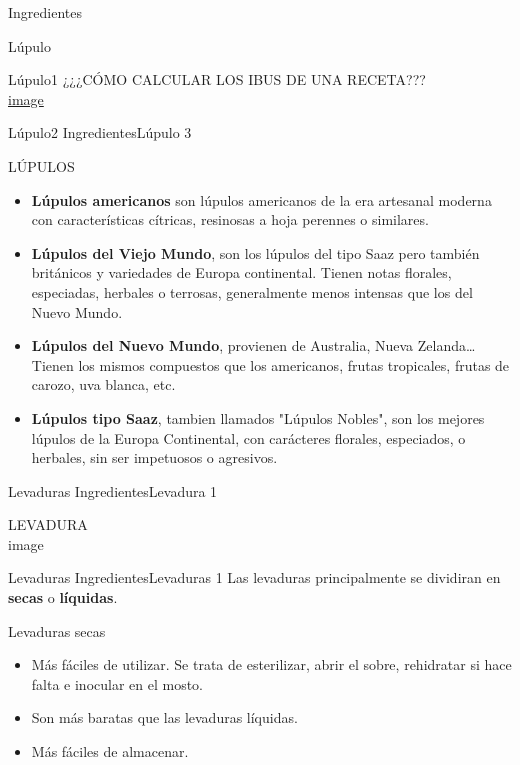 \begin{frame}{Ingredientes}
\begin{block}{Lúpulo}
\begin{block}{Lúpulo1}
¿¿¿CÓMO CALCULAR LOS IBUS DE UNA RECETA???\\
\href{http://www.cerveceros-caseros.com/index.php/calculadora-acce/ibus}{{image}}\\
\end{block}

\begin{block}{Lúpulo2}
\protect\hypertarget{luxfapulo2}{}
IngredientesLúpulo 3

LÚPULOS

\begin{itemize}
\item
  \textbf{Lúpulos americanos} son lúpulos americanos de la era artesanal
  moderna con características cítricas, resinosas a hoja perennes o
  similares.
\item
  \textbf{Lúpulos del Viejo Mundo}, son los lúpulos del tipo Saaz pero
  también británicos y variedades de Europa continental. Tienen notas
  florales, especiadas, herbales o terrosas, generalmente menos intensas
  que los del Nuevo Mundo.
\item
  \textbf{Lúpulos del Nuevo Mundo}, provienen de Australia, Nueva
  Zelanda\ldots Tienen los mismos compuestos que los americanos, frutas
  tropicales, frutas de carozo, uva blanca, etc.
\item
  \textbf{Lúpulos tipo Saaz}, tambien llamados "Lúpulos Nobles", son los
  mejores lúpulos de la Europa Continental, con carácteres florales,
  especiados, o herbales, sin ser impetuosos o agresivos.
\end{itemize}
\end{block}
\end{block}

\begin{block}{Levaduras}
\protect\hypertarget{levaduras}{}
IngredientesLevadura 1

LEVADURA\\
{image}
\end{block}

\begin{block}{Levaduras}
\protect\hypertarget{levaduras-1}{}
IngredientesLevaduras 1 Las levaduras principalmente se dividiran en
\textbf{secas} o \textbf{líquidas}.

Levaduras secas

\begin{itemize}
\item
  Más fáciles de utilizar. Se trata de esterilizar, abrir el sobre,
  rehidratar si hace falta e inocular en el mosto.
\item
  Son más baratas que las levaduras líquidas.
\item
  Más fáciles de almacenar.
\end{itemize}


\end{block}
\end{frame}
